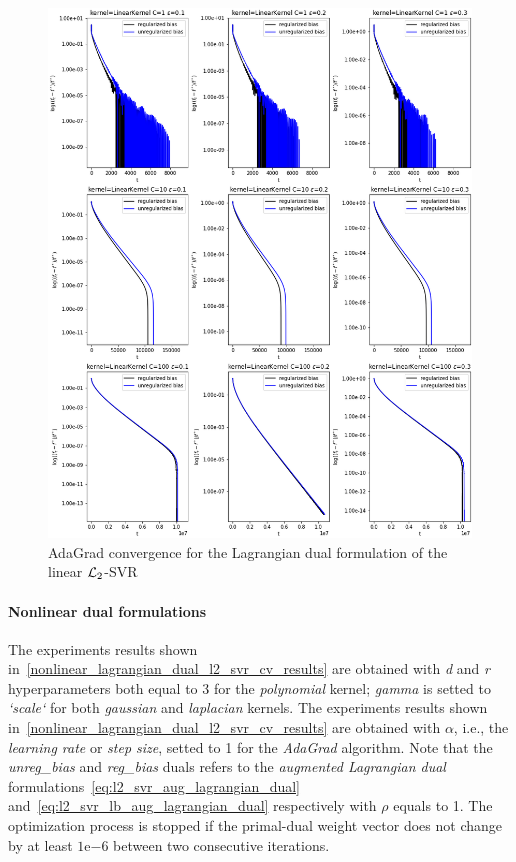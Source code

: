 

\begin{figure}[H]
	\centering
	\includegraphics[scale=0.55]{img/linear_lagrangian_dual_l2_svr_loss_history}
	\caption{AdaGrad convergence for the Lagrangian dual formulation of the linear $\protect \mathcal{L}_2$-SVR}
	\label{fig:linear_lagrangian_dual_l2_svr_loss_history}
\end{figure}

\paragraph{Nonlinear dual formulations}

The experiments results shown in~\ref{nonlinear_lagrangian_dual_l2_svr_cv_results} are obtained with \emph{d} and \emph{r} hyperparameters both equal to 3 for the \emph{polynomial} kernel; \emph{gamma} is setted to \emph{`scale`} for both \emph{gaussian} and \emph{laplacian} kernels. The experiments results shown in~\ref{nonlinear_lagrangian_dual_l2_svr_cv_results} are obtained with $\alpha$, i.e., the \emph{learning rate} or \emph{step size}, setted to 1 for the \emph{AdaGrad} algorithm. Note that the \emph{unreg\_bias} and \emph{reg\_bias} duals refers to the \emph{augmented Lagrangian dual} formulations~\eqref{eq:l2_svr_aug_lagrangian_dual} and~\eqref{eq:l2_svr_lb_aug_lagrangian_dual} respectively with $\rho$ equals to 1. The optimization process is stopped if the primal-dual weight vector does not change by at least $1\mathrm{e}{-6}$  between two consecutive iterations.

